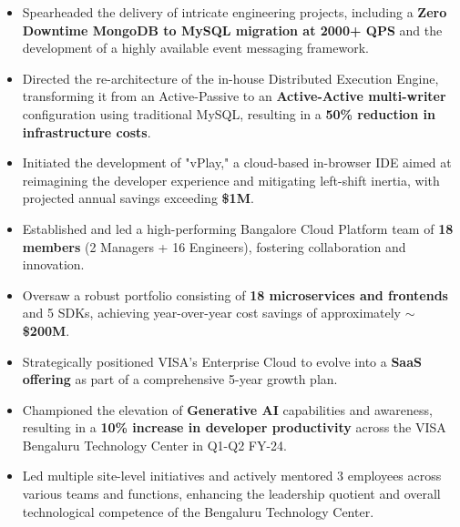 \documentclass[10pt,a4paper,ragged2e,withhyper]{altacv}
\begin{document}
\begin{paracol}{2}


\begin{itemize}
  \item Spearheaded the delivery of intricate engineering projects, including a \textbf{Zero Downtime MongoDB to MySQL migration at 2000+ QPS} and the development of a highly available event messaging framework.
  \item Directed the re-architecture of the in-house Distributed Execution Engine, transforming it from an Active-Passive to an \textbf{Active-Active multi-writer} configuration using traditional MySQL, resulting in a \textbf{50\% reduction in infrastructure costs}.
  \item Initiated the development of "vPlay," a cloud-based in-browser IDE aimed at reimagining the developer experience and mitigating left-shift inertia, with projected annual savings exceeding \textbf{\$1M}.
  \item Established and led a high-performing Bangalore Cloud Platform team of \textbf{18 members} (2 Managers + 16 Engineers), fostering collaboration and innovation.
  \item Oversaw a robust portfolio consisting of \textbf{18 microservices and frontends} and 5 SDKs, achieving year-over-year cost savings of approximately \textbf{\(\sim\)\$200M}.
  \item Strategically positioned VISA's Enterprise Cloud to evolve into a \textbf{SaaS offering} as part of a comprehensive 5-year growth plan.
  \item Championed the elevation of \textbf{Generative AI} capabilities and awareness, resulting in a \textbf{10\% increase in developer productivity} across the VISA Bengaluru Technology Center in Q1-Q2 FY-24.
  \item Led multiple site-level initiatives and actively mentored 3 employees across various teams and functions, enhancing the leadership quotient and overall technological competence of the Bengaluru Technology Center.
\end{itemize}

\divider


\end{paracol}
\end{document}
